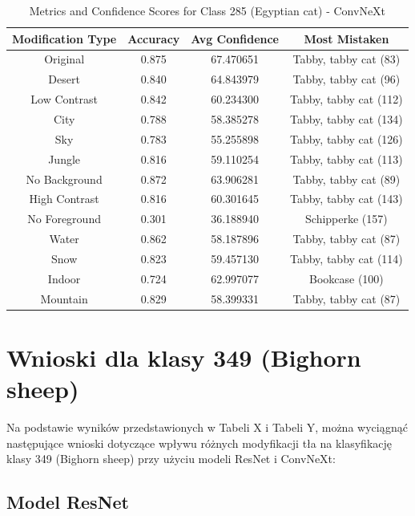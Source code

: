 \begin{table}
	\centering
	\begin{tabular}{|c|c|c|c|}
		\hline
		\textbf{Modification Type} & \textbf{Accuracy} & \textbf{Avg Confidence} & \textbf{Most Mistaken} \\
		\hline
		Original & 0.875 & 67.470651 & Tabby, tabby cat (83) \\
		\hline
		Desert & 0.840 & 64.843979 & Tabby, tabby cat (96) \\
		\hline
		Low Contrast & 0.842 & 60.234300 & Tabby, tabby cat (112) \\
		\hline
		City & 0.788 & 58.385278 & Tabby, tabby cat (134) \\
		\hline
		Sky & 0.783 & 55.255898 & Tabby, tabby cat (126) \\
		\hline
		Jungle & 0.816 & 59.110254 & Tabby, tabby cat (113) \\
		\hline
		No Background & 0.872 & 63.906281 & Tabby, tabby cat (89) \\
		\hline
		High Contrast & 0.816 & 60.301645 & Tabby, tabby cat (143) \\
		\hline
		No Foreground & 0.301 & 36.188940 & Schipperke (157) \\
		\hline
		Water & 0.862 & 58.187896 & Tabby, tabby cat (87) \\
		\hline
		Snow & 0.823 & 59.457130 & Tabby, tabby cat (114) \\
		\hline
		Indoor & 0.724 & 62.997077 & Bookcase (100) \\
		\hline
		Mountain & 0.829 & 58.399331 & Tabby, tabby cat (87) \\
		\hline
	\end{tabular}
	\caption{Metrics and Confidence Scores for Class 285 (Egyptian cat) - ConvNeXt}
	\label{tab:metrics_confidence_class_285_convnext}
\end{table}

\section*{Wnioski dla klasy 349 (Bighorn sheep)}

Na podstawie wyników przedstawionych w Tabeli X i Tabeli Y, można wyciągnąć następujące wnioski dotyczące wpływu różnych modyfikacji tła na klasyfikację klasy 349 (Bighorn sheep) przy użyciu modeli ResNet i ConvNeXt:

\subsection*{Model ResNet}

